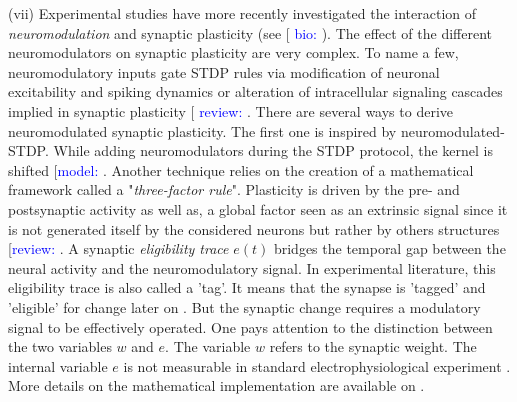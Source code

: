 (vii) Experimental studies have more recently investigated  the interaction of \textit{neuromodulation} and synaptic plasticity (see [ \textcolor{blue}{bio:} \cite{seol_neuromodulators_2007, zhang_gain_2009, salgado_noradrenergic_2012, pawlak_dopamine_2008, nadim_neuromodulation_2014}). The effect of the different neuromodulators on synaptic plasticity are very complex. To name a few, neuromodulatory inputs gate STDP rules via modification of neuronal excitability and spiking dynamics or alteration of intracellular signaling cascades implied in synaptic
plasticity [ \textcolor{blue}{review:} \cite{brzosko_neuromodulation_2019,fremaux_neuromodulated_2015, pawlak_timing_2010}. There are several ways to derive neuromodulated synaptic plasticity. The first one is inspired by neuromodulated-STDP. While adding neuromodulators during the STDP protocol, the kernel is shifted [\textcolor{blue}{model:} \cite{pedrosa_role_2017, gonzalez-rueda_activity-dependent_2018, izhikevich_solving_2007, legenstein_learning_2008}. Another technique relies on the creation of a mathematical framework called a "\textit{three-factor rule}". Plasticity is driven by the pre- and postsynaptic activity  as well as, a global factor seen as an extrinsic signal since it is not generated itself by the considered neurons but rather by others structures [\textcolor{blue}{review:} \cite{marder_neuromodulation_2012, fremaux_reinforcement_2013, izhikevich_solving_2007, brzosko_neuromodulation_2019, fremaux_neuromodulated_2015,schultz_behavioral_2006, foncelle_modulation_2018}. A synaptic \textit{eligibility trace} $e(t)$ bridges the temporal gap between the neural activity and the neuromodulatory signal. In experimental literature, this  eligibility trace is also called a 'tag'. It means that the synapse is 'tagged' and 'eligible' for change later on \citep{fremaux_neuromodulated_2015, magee_synaptic_2020}. But the synaptic change requires a modulatory signal to be effectively operated. One pays attention to the distinction between the two variables $w$ and $e$. The variable $w$ refers to the synaptic weight. The internal variable $e$ is not measurable in standard electrophysiological experiment \citep{gerstner_eligibility_2018}. More details on the mathematical implementation are available on \cite{izhikevich_solving_2007, legenstein_learning_2008,gerstner_eligibility_2018,fremaux_neuromodulated_2015, pawlak_timing_2010, madadi_asl_dopaminergic_2018}.  

